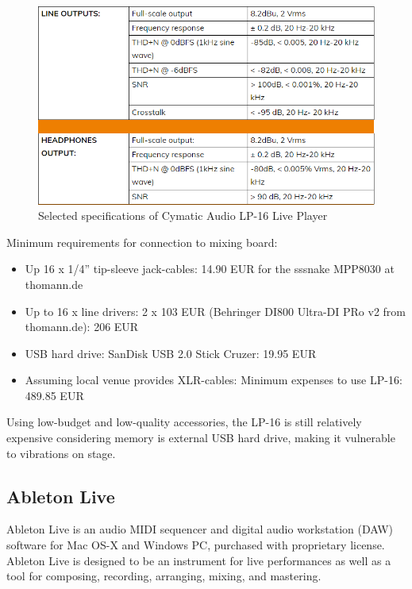 \begin{figure}[H]
\centering
\includegraphics[scale=0.7]{./pictures/lp16.png}
\caption{Selected specifications of Cymatic Audio LP-16 Live Player}
\label{fig:lp16.png}
\end{figure}

Minimum requirements for connection to mixing board: \\

\begin{itemize}
\item Up 16 x 1/4'' tip-sleeve jack-cables: 14.90 EUR for the sssnake MPP8030 at thomann.de
\item Up to 16 x line drivers: 2 x 103 EUR (Behringer DI800 Ultra-DI PRo v2 from thomann.de): 206 EUR
\item USB hard drive: SanDisk USB 2.0 Stick Cruzer: 19.95 EUR
\item Assuming local venue provides XLR-cables: Minimum expenses to use LP-16: 489.85 EUR
\end{itemize}

Using low-budget and low-quality accessories, the LP-16 is still relatively expensive considering memory is external USB hard drive, making it vulnerable to vibrations on stage.

\subsection{Ableton Live}
Ableton Live is an audio MIDI sequencer and digital audio workstation (DAW) software for Mac OS-X and Windows PC, purchased with proprietary license. Ableton Live is designed to be an instrument for live performances as well as a tool for composing, recording, arranging, mixing, and mastering. \newline

